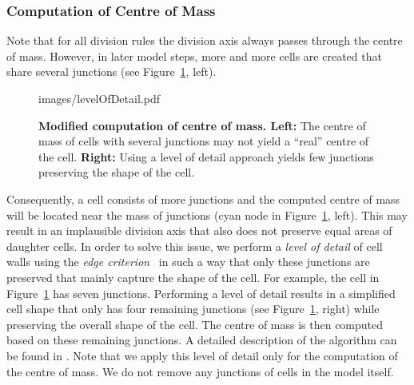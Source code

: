 \documentclass[11pt,a4paper, final]{article}
\begin{document}
\subsubsection{Computation of Centre of Mass}
\noindent
Note that for all division rules the division axis always passes through the centre of mass. However, in later model steps, more and more cells are created that share several junctions (see Figure~\ref{fig:levelOfDetail}, left).
%
\begin{figure}[htbp]
	\begin{center}
		\begin{overpic}[width=1.\linewidth]{images/levelOfDetail.pdf}
		\end{overpic}
\caption[]
{
{\bf Modified computation of centre of mass. Left:} The centre of mass of cells with several junctions may not yield a ``real'' centre of the cell. \textbf{Right:} Using a level of detail approach yields few junctions preserving the shape of the cell.
}
	\label{fig:levelOfDetail}
	\end{center}
\end{figure}
%
Consequently, a cell consists of more junctions and the computed centre of mass will be located near the mass of junctions (cyan node in Figure~\ref{fig:levelOfDetail}, left). This may result in an implausible division axis that also does not preserve equal areas of daughter cells. In order to solve this issue, we perform a \textit{level of detail} of cell walls using the \textit{edge criterion}~\cite{jenks_1989} in such a way that only these junctions are preserved that mainly capture the shape of the cell. For example, the cell in Figure~\ref{fig:levelOfDetail} has seven junctions. Performing a level of detail results in a simplified cell shape that only has four remaining junctions (see Figure~\ref{fig:levelOfDetail}, right) while preserving the overall shape of the cell. The centre of mass is then computed based on these remaining junctions. A detailed description of the algorithm can be found in \cite[p.\ 59--60]{FangerauDiss_2015}. Note that we apply this level of detail only for the computation of the centre of mass. We do not remove any junctions of cells in the model itself.
\end{document}
